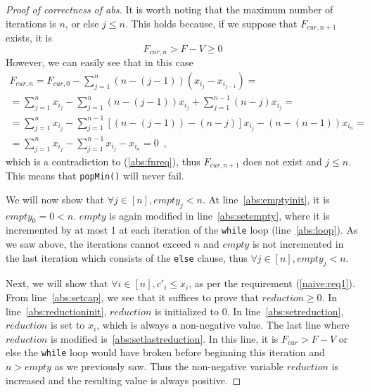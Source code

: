 \begin{proof}[Proof of correctness of abs]
  It is worth noting that the maximum number of iterations is $n$, or else $j \leq n$. This holds because, if we suppose that
  $F_{cur, n+1}$ exists, it is
  \begin{equation}
  \label{abs:fnreq}
    F_{cur, n} > F - V \geq 0
  \end{equation}
  However, we can easily see that in this case
  \begin{equation*}
  \begin{gathered}
    F_{cur, n} = F_{cur, 0} - \sum\limits_{j=1}^n\left(n - \left(j-1\right)\right)\left(x_{i_j} - x_{i_{j-1}}\right) = \\
    = \sum\limits_{j=1}^nx_{i_j} - \sum\limits_{j=1}^n\left(n - \left(j - 1\right)\right)x_{i_j} +
    \sum\limits_{j=1}^{n-1}\left(n - j\right)x_{i_j} = \\
    = \sum\limits_{j=1}^nx_{i_j} - \sum\limits_{j=1}^{n-1}[\left(n - \left(j - 1\right)\right) - \left(n - j\right)]x_{i_j}
    - \left(n - \left(n - 1\right)\right)x_{i_n} = \\
    = \sum\limits_{j=1}^nx_{i_j} - \sum\limits_{j=1}^{n-1}x_{i_j} - x_{i_n} = 0\enspace,
  \end{gathered}
  \end{equation*}
  which is a contradiction to (\ref{abs:fnreq}), thus $F_{cur, n+1}$ does not exist and $j \leq n$. This means
  that \texttt{popMin()} will never fail.

  We will now show that $\forall j \in [n], empty_j < n$. At line~\ref{abs:emptyinit}, it is $empty_0 = 0 < n$. $empty$
  is again modified in line~\ref{abs:setempty}, where it is incremented by at most 1 at each iteration of the \texttt{while}
  loop (line~\ref{abs:loop}). As we saw above, the iterations cannot exceed $n$ and $empty$ is not incremented in the last
  iteration which consists of the \texttt{else} clause, thus $\forall j \in [n], empty_j < n$.

  Next, we will show that $\forall i \in [n], c'_i \leq x_i$, as per the requirement (\ref{naive:req1}). From
  line~\ref{abs:setcap}, we see that it suffices to prove that $reduction \geq 0$. In line~\ref{abs:reductioninit},
  $reduction$ is initialized to 0. In line~\ref{abs:setreduction}, $reduction$ is set to $x_i$, which is always
  a non-negative value. The last line where $reduction$ is modified is~\ref{abs:setlastreduction}. In this line, it is
  $F_{cur} > F - V$ or else the \texttt{while} loop would have broken before beginning this iteration and $n > empty$ as we
  previously saw. Thus the non-negative variable $reduction$ is increased and the resulting value is always positive.


\end{proof}

